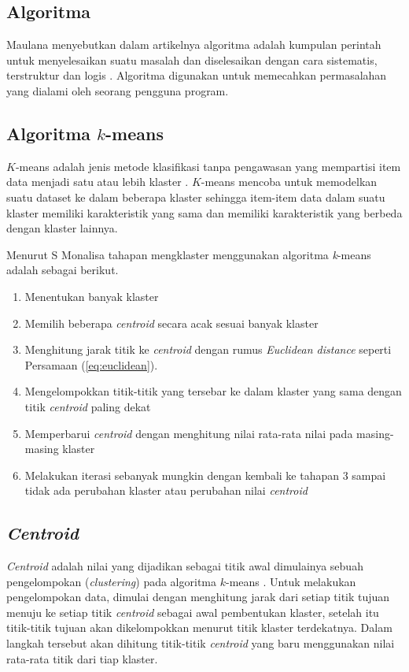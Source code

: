 \subsection{Algoritma}

Maulana menyebutkan dalam artikelnya algoritma adalah kumpulan perintah untuk menyelesaikan suatu masalah dan diselesaikan dengan cara sistematis, terstruktur dan logis \cite{maulana2017pembelajaran}. Algoritma digunakan untuk memecahkan permasalahan yang dialami oleh seorang pengguna program.

\subsection{Algoritma $k$-means}

$K$-means adalah jenis metode klasifikasi tanpa pengawasan yang mempartisi item data menjadi satu atau lebih klaster \cite{agusta2007k}. $K$-means mencoba untuk memodelkan suatu dataset ke dalam beberapa klaster sehingga item-item data dalam suatu klaster memiliki karakteristik yang sama dan memiliki karakteristik yang berbeda dengan klaster lainnya.

Menurut S Monalisa \cite{monalisa2018klasterisasi} tahapan mengklaster menggunakan algoritma \textit{k}-means adalah sebagai berikut.

\begin{enumerate}
	\item Menentukan banyak klaster
	\item Memilih beberapa \textit{centroid} secara acak sesuai banyak klaster
	\item Menghitung jarak titik ke \textit{centroid} dengan rumus \textit{Euclidean distance} seperti Persamaan (\ref{eq:euclidean}).
	\item Mengelompokkan titik-titik yang tersebar ke dalam klaster yang sama dengan titik \textit{centroid} paling dekat
	\item Memperbarui \textit{centroid} dengan menghitung nilai rata-rata nilai pada masing-masing klaster
	\item Melakukan iterasi sebanyak mungkin dengan kembali ke tahapan 3 sampai tidak ada perubahan klaster atau perubahan nilai \textit{centroid}
\end{enumerate}

\subsection{\textit{Centroid}}

\textit{Centroid} adalah nilai yang dijadikan sebagai titik awal dimulainya sebuah pengelompokan (\textit{clustering}) pada algoritma $k$-means \cite{retno2019peningkatan}. Untuk melakukan pengelompokan data, dimulai dengan menghitung jarak dari setiap titik tujuan menuju ke setiap titik \textit{centroid} sebagai awal pembentukan klaster, setelah itu titik-titik tujuan akan dikelompokkan menurut titik klaster terdekatnya. Dalam langkah tersebut akan dihitung titik-titik \textit{centroid} yang baru menggunakan nilai rata-rata titik dari tiap klaster.

